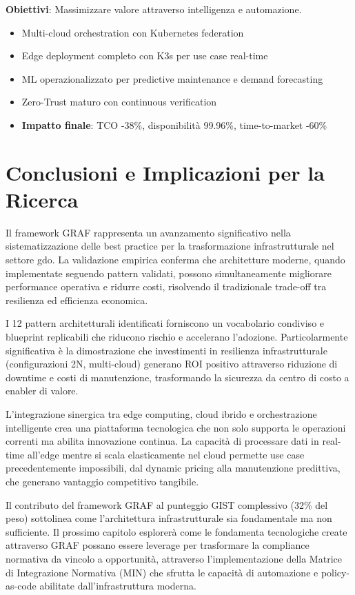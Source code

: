 \textbf{Obiettivi}: Massimizzare valore attraverso intelligenza e automazione.
\begin{itemize}
\item Multi-cloud orchestration con Kubernetes federation
\item Edge deployment completo con K3s per use case real-time
\item ML operazionalizzato per predictive maintenance e demand forecasting
\item Zero-Trust maturo con continuous verification
\item \textbf{Impatto finale}: TCO -38\%, disponibilità 99.96\%, time-to-market -60\%
\end{itemize}

\section{\texorpdfstring{Conclusioni e Implicazioni per la Ricerca}{3.8 - Conclusioni e Implicazioni per la Ricerca}}
\label{sec:cap3_conclusioni}

Il framework GRAF rappresenta un avanzamento significativo nella sistematizzazione delle best practice per la trasformazione infrastrutturale nel settore \gls{gdo}. La validazione empirica conferma che architetture moderne, quando implementate seguendo pattern validati, possono simultaneamente migliorare performance operativa e ridurre costi, risolvendo il tradizionale trade-off tra resilienza ed efficienza economica.

I 12 pattern architetturali identificati forniscono un vocabolario condiviso e blueprint replicabili che riducono rischio e accelerano l'adozione. Particolarmente significativa è la dimostrazione che investimenti in resilienza infrastrutturale (configurazioni 2N, multi-cloud) generano ROI positivo attraverso riduzione di downtime e costi di manutenzione, trasformando la sicurezza da centro di costo a enabler di valore.

L'integrazione sinergica tra edge computing, cloud ibrido e orchestrazione intelligente crea una piattaforma tecnologica che non solo supporta le operazioni correnti ma abilita innovazione continua. La capacità di processare dati in real-time all'edge mentre si scala elasticamente nel cloud permette use case precedentemente impossibili, dal dynamic pricing alla manutenzione predittiva, che generano vantaggio competitivo tangibile.

Il contributo del framework GRAF al punteggio GIST complessivo (32\% del peso) sottolinea come l'architettura infrastrutturale sia fondamentale ma non sufficiente. Il prossimo capitolo esplorerà come le fondamenta tecnologiche create attraverso GRAF possano essere leverage per trasformare la compliance normativa da vincolo a opportunità, attraverso l'implementazione della Matrice di Integrazione Normativa (MIN) che sfrutta le capacità di automazione e policy-as-code abilitate dall'infrastruttura moderna.

